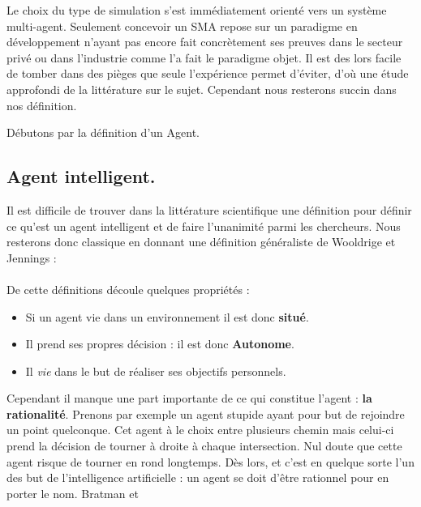 \documentclass[a4paper,11pt]{article}
\begin{document}
Le choix du type de simulation s'est immédiatement orienté vers un système multi-agent. Seulement concevoir un SMA repose sur un paradigme en développement n'ayant pas encore fait concrètement ses preuves dans le secteur privé ou dans l'industrie comme l'a fait le paradigme objet. Il est des lors facile de tomber dans des pièges que seule l'expérience permet d'éviter, d'où une étude approfondi de la littérature sur le sujet. Cependant nous resterons succin dans nos définition.

Débutons par la définition d'un Agent.

\subsection{Agent intelligent.}
Il est difficile de trouver dans la littérature scientifique une définition pour définir ce qu'est un agent intelligent et de faire l'unanimité parmi les chercheurs. Nous resterons donc classique en donnant une définition généraliste de Wooldrige et Jennings \cite{jennings1998agent} : \\

\\

De cette définitions découle quelques propriétés : 
\begin{itemize}
  \item Si un agent vie dans un environnement il est donc \textbf{situé}.
  \item Il prend ses propres décision : il est donc \textbf{Autonome}.
  \item Il \textit{vie} dans le but de réaliser ses objectifs personnels.
\end{itemize}

Cependant il manque une part importante de ce qui constitue l'agent : \textbf{la rationalité}. Prenons par exemple un agent stupide ayant pour but de rejoindre un point quelconque. Cet agent à le choix entre plusieurs chemin mais celui-ci prend la décision de tourner à droite à chaque intersection. Nul doute que cette agent risque de tourner en rond longtemps. Dès lors, et c'est en quelque sorte l'un des but de l'intelligence artificielle : un agent se doit d'être rationnel pour en porter le nom. Bratman \cite{AICPub540:1988} et \cite{bratman1987intention}
\end{document}
